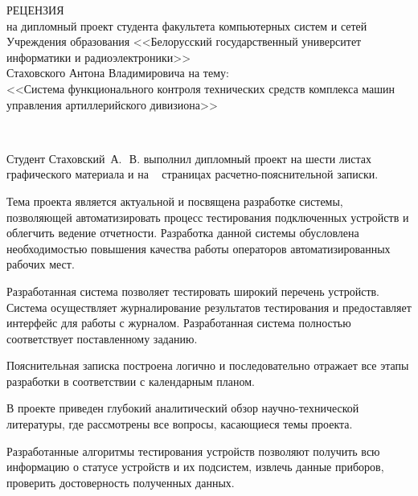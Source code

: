 
\thispagestyle{empty}

\begin{singlespace}

{\small
  \begin{center}
    \begin{minipage}{1.0\textwidth}
      \begin{center}
        {\normalsize РЕЦЕНЗИЯ}\\[0.2cm]
        на дипломный проект студента факультета компьютерных систем и сетей Учреждения образования <<Белорусский государственный университет информатики и радиоэлектроники>>\\
        Стаховского Антона Владимировича на тему: \\
	      <<Система функционального контроля технических средств комплекса машин управления артиллерийского
	      дивизиона>>
      \end{center}
    \end{minipage}\\
  \end{center}

  Студент Стаховский~А.~\,В. выполнил дипломный проект на шести листах графического материала и на
  ~\pageref*{LastPage} страницах расчетно-пояснительной записки.

  Тема проекта является актуальной и посвящена разработке системы, позволяющей автоматизировать процесс тестирования
	подключенных устройств и облегчить ведение отчетности.
  Разработка данной системы обусловлена необходимостью повышения качества работы операторов автоматизированных рабочих
	мест.

  Разработанная система позволяет тестировать широкий перечень устройств. Система
	осуществляет журналирование результатов тестирования и предоставляет интерфейс для работы с журналом.
	Разработанная система полностью соответствует поставленному заданию.

  Пояснительная записка построена логично и последовательно отражает все этапы разработки в соответствии с календарным планом.

  В проекте приведен глубокий аналитический обзор научно-технической литературы, где рассмотрены все
	вопросы, касающиеся темы проекта.

  Разработанные алгоритмы тестирования устройств позволяют получить всю информацию о статусе устройств и их подсистем,
	извлечь данные приборов, проверить достоверность полученных данных.

}
\end{singlespace}
